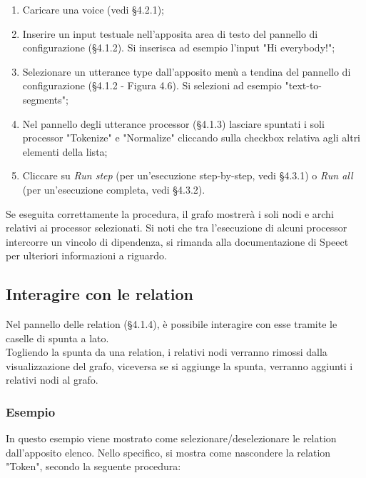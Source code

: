 \documentclass[openany,12pt,a4paper]{report}
\begin{document}
	\begin{enumerate}
		
		\item Caricare una voice (vedi §4.2.1);
		\item Inserire un input testuale nell'apposita area di testo del pannello di configurazione (§4.1.2). Si inserisca ad esempio l'input "Hi everybody!";
		\item Selezionare un utterance type dall'apposito menù a tendina del pannello di configurazione (§4.1.2 - Figura 4.6). Si selezioni ad esempio "text-to-segments";
		\item Nel pannello degli utterance processor (§4.1.3) lasciare spuntati i soli processor "Tokenize" e "Normalize" cliccando sulla checkbox relativa agli altri elementi della lista;
		\item Cliccare su \textit{Run step} (per un'esecuzione step-by-step, vedi §4.3.1) o \textit{Run all} (per un'esecuzione completa, vedi §4.3.2).
	\end{enumerate}

	\noindent Se eseguita correttamente la procedura, il grafo mostrerà i soli nodi e archi relativi ai processor selezionati. Si noti che tra l'esecuzione di alcuni processor intercorre un vincolo di dipendenza, si rimanda alla documentazione di Speect per ulteriori informazioni a riguardo.
	
	\subsection{Interagire con le relation}
	Nel pannello delle relation (§4.1.4), è possibile interagire con esse tramite le caselle di spunta a lato.\\
	Togliendo la spunta da una relation, i relativi nodi verranno rimossi dalla visualizzazione del grafo, viceversa se si aggiunge la spunta, verranno aggiunti i relativi nodi al grafo.
	
	\subsubsection*{Esempio}
	
	In questo esempio viene mostrato come selezionare/deselezionare le relation dall'apposito elenco. Nello specifico, si mostra come nascondere la relation "Token", secondo la seguente procedura:
	
\end{document}
